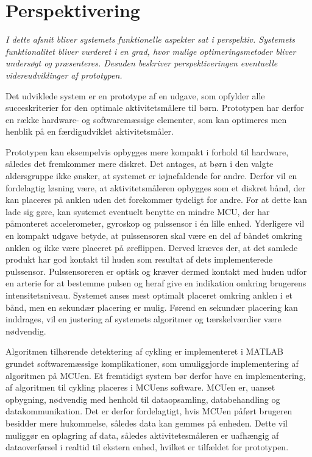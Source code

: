 \section{Perspektivering}\label{sec:perspektivering}
\textit{I dette afsnit bliver systemets funktionelle aspekter sat i perspektiv. Systemets funktionalitet bliver vurderet i en grad, hvor mulige optimeringsmetoder bliver undersøgt og præsenteres. Desuden beskriver perspektiveringen eventuelle videreudviklinger af prototypen.}

Det udviklede system er en prototype af en udgave, som opfylder alle succeskriterier for den optimale aktivitetsmålere til børn. Prototypen har derfor en række hardware- og softwaremæssige elementer, som kan optimeres men henblik på en færdigudviklet aktivitetsmåler.

Prototypen kan eksempelvis opbygges mere kompakt i forhold til hardware, således det fremkommer mere diskret. Det antages, at børn i den valgte aldersgruppe ikke ønsker, at systemet er iøjnefaldende for andre. Derfor vil en fordelagtig løsning være, at aktivitetsmåleren opbygges som et diskret bånd, der kan placeres på anklen uden det forekommer tydeligt for andre. For at dette kan lade sig gøre, kan systemet eventuelt benytte en mindre MCU, der har påmonteret accelerometer, gyroskop og pulssensor i én lille enhed. Yderligere vil en kompakt udgave betyde, at pulssensoren skal være en del af båndet omkring anklen og ikke være placeret på øreflippen. Derved kræves der, at det samlede produkt har god kontakt til huden som resultat af dets implementerede pulssensor. Pulssensoreren er optisk og kræver dermed kontakt med huden udfor en arterie for at bestemme pulsen og heraf give en indikation omkring brugerens intensitetsniveau. Systemet anses mest optimalt placeret omkring anklen i et bånd, men en sekundær placering er mulig. Førend en sekundær placering kan inddrages, vil en justering af systemets algoritmer og tærskelværdier være nødvendig. 

Algoritmen tilhørende detektering af cykling er implementeret i MATLAB grundet softwaremæssige komplikationer, som umuliggjorde implementering af algoritmen på MCUen. Et fremtidigt system bør derfor have en implementering, af algoritmen til cykling placeres i MCUens software. MCUen er, uanset opbygning, nødvendig med henhold til dataopsamling, databehandling og datakommunikation. Det er derfor fordelagtigt, hvis MCUen påført brugeren besidder mere hukommelse, således data kan gemmes på enheden. Dette vil muliggør en oplagring af data, således aktivitetesmåleren er uafhængig af dataoverførsel i realtid til ekstern enhed, hvilket er tilfældet for prototypen. 

